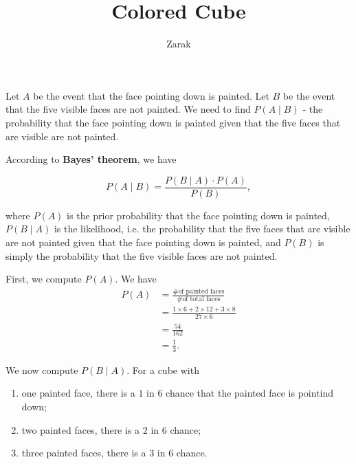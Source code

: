 \documentclass{article}
\title{Colored Cube}
\author{Zarak}
\theoremstyle{mytheoremstyle}
\theoremstyle{mytheoremstyle}
\theoremstyle{myproblemstyle}
\begin{document}
    \maketitle

    Let \( A \) be the event that the face pointing down is painted. Let \( B
    \) be the event that the five visible faces are not painted. We need to
    find \( P(A \mid B) \) - the probability that the face pointing down is
    painted given that the five faces that are visible are not painted.

    According to \textbf{Bayes' theorem}, we have

    \begin{definition}
      
      \begin{displaymath}
      P(A \mid B) = \frac{P(B \mid A) \cdot P(A)}{P(B)},
      \end{displaymath}
      
    \end{definition}
    

    where \( P(A) \) is the prior probability that the face pointing down is
    painted, \( P(B \mid A) \) is the likelihood, i.e. the probability that the
    five faces that are visible are not painted given that the face pointing
    down is painted, and \( P(B) \) is simply the probability that the five
    visible faces are not painted.

    First, we compute \( P(A) \). We have 
    \begin{align*}
      P(A) &= \frac{\text{\# of painted faces}}{\text{\# of total faces}} \\
           &= \frac{1 \times 6 + 2 \times 12 + 3 \times 8}{27 \times 6} \\
           &= \frac{54}{162} \\
           &= \frac{1}{3}.
    \end{align*}

    We now compute \( P(B \mid A) \). For a cube with 
    \begin{enumerate}
      \item one painted face, there is a \( 1 \) in \( 6 \) chance that the
        painted face is pointind down;
      \item two painted faces, there is a \( 2 \) in \( 6 \) chance;
      \item three painted faces, there is a \( 3 \) in \( 6 \) chance.
    \end{enumerate}
\end{document}
